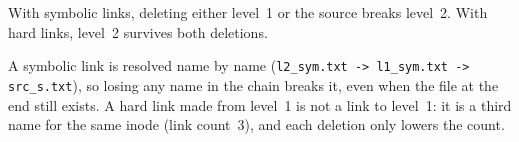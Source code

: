 
With symbolic links, deleting either level~1 or the source breaks level~2. With
hard links, level~2 survives both deletions.

A symbolic link is resolved name by name (\texttt{l2\_sym.txt -> l1\_sym.txt ->
src\_s.txt}), so losing any name in the chain breaks it, even when the file at
the end still exists. A hard link made from level~1 is not a link to level~1:
it is a third name for the same inode (link count~3), and each deletion only
lowers the count.
